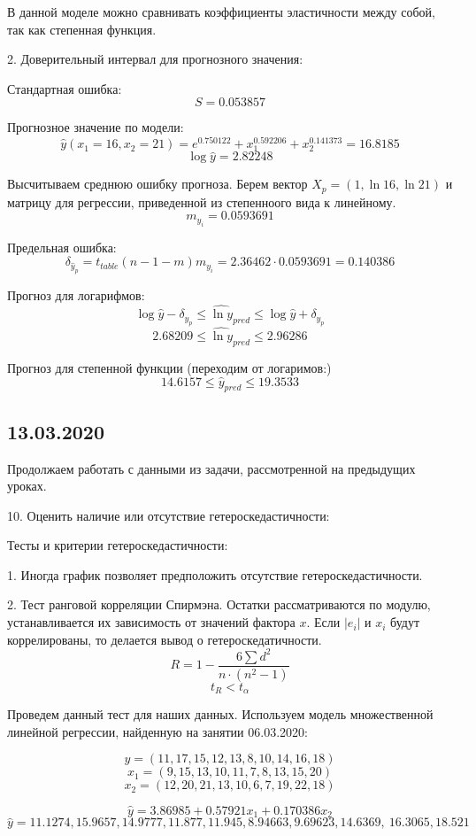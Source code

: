 \documentclass[aps,%
12pt,%
final,%
oneside,
onecolumn,%
musixtex, %
superscriptaddress,%
centertags]{article} %
\begin{document}
В данной моделе можно сравнивать коэффициенты эластичности между собой, так как степенная функция.

2. Доверительный интервал для прогнозного значения:

Стандартная ошибка:
$$ S = 0.053857$$

Прогнозное значение по модели:
$$\hat{y}(x_1 = 16,x_2 = 21) = e^{0.750122} + x_1^{0.592206} + x_2^{ 0.141373} = 16.8185 $$
$$\log{\hat{y}} = 2.82248$$

Высчитываем среднюю ошибку прогноза. Берем вектор $X_p = (1,\ln 16, \ln 21)$ и матрицу для регрессии, приведенной из степенноого вида к линейному.
$$m_{y_i} =  0.0593691$$

Предельная ошибка:
$$\delta_{\hat{y}_p} = t_{table}(n-1-m) m_{y_i} =2.36462 \cdot 0.0593691 = 0.140386 $$

Прогноз для логарифмов:
$$ \log{\hat{y}} -  \delta_{\hat{y}_p}  \leq \hat{\ln y}_{pred} \leq \log{\hat{y}} +  \delta_{\hat{y}_p}$$
$$2.68209 \leq \hat{\ln y}_{pred} \leq  2.96286$$

Прогноз для степенной функции (переходим от логаримов:)
$$ 14.6157 \leq \hat{y}_{pred} \leq 19.3533$$

\subsection{13.03.2020}

Продолжаем работать с данными из задачи, рассмотренной на предыдущих уроках.

10. Оценить наличие или отсутствие гетероскедастичности:

Тесты и критерии гетероскедастичности: 

1. Иногда график позволяет предположить отсутствие гетероскедастичности.

2. Тест ранговой корреляции Спирмэна. Остатки рассматриваются по модулю, устанавливается их зависимость от значений фактора $x$. Если $|e_i|$ и $x_i$ будут коррелированы, то делается вывод о гетероскедатичности.
$$ R = 1 - \frac{6\sum d^2}{n \cdot (n^2 - 1)}$$
$$t_R < t_{\alpha}$$

Проведем данный тест для наших данных. Используем модель множественной линейной регрессии, найденную на занятии 06.03.2020:

$$y = (11, 17, 15, 12, 13, 8, 10, 14, 16, 18)$$
$$x_1 =(9, 15, 13, 10, 11, 7, 8, 13, 15, 20)$$
$$x_2 = (12, 20, 21, 13, 10, 6, 7, 19, 22, 18)$$

$$\widehat{y} = 3.86985 + 0.57921x_1 + 0.170386x_2$$
$$ \widehat{y}  = 11.1274, 15.9657, 14.9777, 11.877, 11.945, 8.94663, 9.69623, 14.6369, \
16.3065, 18.521$$
\end{document}
